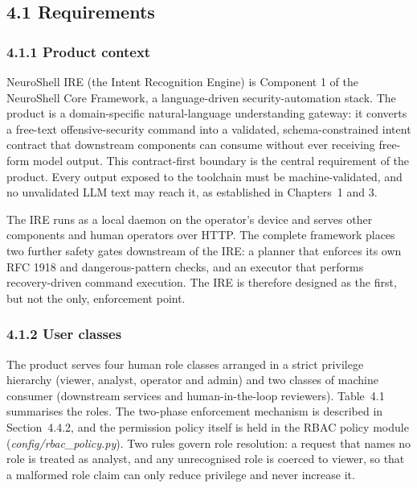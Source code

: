 \documentclass[
]{article}
\begin{document}
\hypertarget{requirements}{%
\subsection{4.1 Requirements}\label{requirements}}

\hypertarget{product-context}{%
\subsubsection{4.1.1 Product context}\label{product-context}}

NeuroShell IRE (the Intent Recognition Engine) is Component 1 of the
NeuroShell Core Framework, a language-driven security-automation stack.
The product is a domain-specific natural-language understanding gateway:
it converts a free-text offensive-security command into a validated,
schema-constrained intent contract that downstream components can
consume without ever receiving free-form model output. This
contract-first boundary is the central requirement of the product. Every
output exposed to the toolchain must be machine-validated, and no
unvalidated LLM text may reach it, as established in Chapters~1 and 3.

The IRE runs as a local daemon on the operator's device and serves other
components and human operators over HTTP. The complete framework places
two further safety gates downstream of the IRE: a planner that enforces
its own RFC 1918 and dangerous-pattern checks, and an executor that
performs recovery-driven command execution. The IRE is therefore
designed as the first, but not the only, enforcement point.

\hypertarget{user-classes}{%
\subsubsection{4.1.2 User classes}\label{user-classes}}

The product serves four human role classes arranged in a strict
privilege hierarchy (viewer, analyst, operator and admin) and two
classes of machine consumer (downstream services and human-in-the-loop
reviewers). Table~4.1 summarises the roles. The two-phase enforcement
mechanism is described in Section~4.4.2, and the permission policy
itself is held in the RBAC policy module
(\emph{config/rbac\_policy.py}). Two rules govern role resolution: a
request that names no role is treated as analyst, and any unrecognised
role is coerced to viewer, so that a malformed role claim can only
reduce privilege and never increase it.
\end{document}
